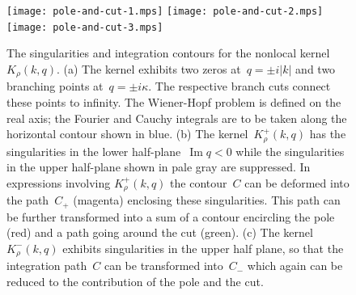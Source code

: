 \documentclass[preprint,aps,eqsecnum, prb]{revtex4-1}
\newcommand{\fplus}[1]{{#1}^{+}}
\newcommand{\fminus}[1]{{#1}^{-}}
\renewcommand{\Im}{\mathop{\mathrm{Im}}\nolimits}
\begin{document}
\begin{figure}[h]
  \centering
  \texttt{[image: pole-and-cut-1.mps]} \qquad
  \texttt{[image: pole-and-cut-2.mps]} \qquad
  \texttt{[image: pole-and-cut-3.mps]}
  \caption{
   \label{fig:contours}
   The singularities and integration contours for the nonlocal kernel
   $K_\rho(k, q)$. (a) The kernel exhibits two zeros at~$q = \pm i|k|$
   and two branching points at~$q = \pm i \kappa$. The respective
   branch cuts connect these points to infinity. The Wiener-Hopf
   problem is defined on the real axis; the Fourier and Cauchy integrals
   are to be taken along the horizontal contour shown in blue.
   (b) The kernel~$\fplus{K}_\rho(k, q)$ has the singularities in the
   lower half-plane~$\Im q < 0$ while the singularities in the upper half-plane
   shown in pale gray are suppressed. In expressions involving
   $\fplus{K}_\rho(k, q)$ the contour~$C$ can be deformed into the path~$C_+$
   (magenta) enclosing these singularities. This path can be further
   transformed into a sum of a contour encircling the pole (red)
   and a path going around the cut (green). (c)
   The kernel~$\fminus{K}_\rho(k, q)$ exhibits singularities in
   the upper half plane, so that the integration path~$C$ can
   be transformed into~$C_-$ which again can be reduced to the
   contribution of the pole and the cut. }
\end{figure}
\end{document}
